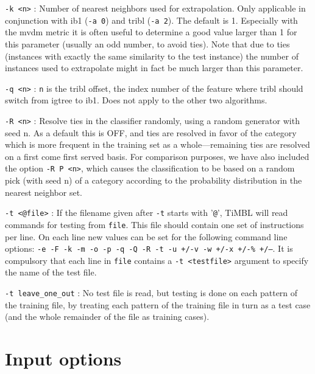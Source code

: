 \documentclass{report}
\begin{document}
\begin{description}
\item {\tt -k <n>} : Number of nearest neighbors used for
extrapolation. Only applicable in conjunction with {\sc ib1} ({\tt -a
0}) and {\sc tribl} ({\tt -a 2}). The default is 1. Especially with
the {\sc mvdm} metric it is often useful to determine a good value
larger than 1 for this parameter (usually an odd number, to avoid
ties). Note that due to ties (instances with exactly the same
similarity to the test instance) the number of instances used to
extrapolate might in fact be much larger than this parameter.

\item {\tt -q <n>} : {\tt n} is the {\sc tribl} offset, the index
number of the feature where {\sc tribl} should switch from {\sc
igtree} to {\sc ib1}. Does not apply to the other two algorithms.

\item {\tt -R <n>} : Resolve ties in the classifier randomly, using a
random generator with seed n. As a default this is OFF, and ties are
resolved in favor of the category which is more frequent in the
training set as a whole---remaining ties are resolved on a first come
first served basis. For comparison purposes, we have also included the
option {\tt -R P <n>}, which causes the classification to be based on
a random pick (with seed n) of a category according to the probability
distribution in the nearest neighbor set.

\item {\tt -t <@file>} : If the filename given after {\tt -t} starts
with '{\tt @}', TiMBL will read commands for testing from {\tt file}.
This file should contain one set of instructions per line. On each
line new values can be set for the following command line options:
{\tt -e -F -k -m -o -p -q -Q -R -t -u +/-v -w +/-x +/-\% +/--}. It is compulsory
that each line in {\tt file} contains a {\tt -t <testfile>} argument
to specify the name of the test file.

\item {\tt -t leave\_one\_out} : No test file is read, but testing is
done on each pattern of the training file, by treating each pattern of
the training file in turn as a test case (and the whole remainder of
the file as training cases).

\end{description}

\section{Input options}
\end{document}

